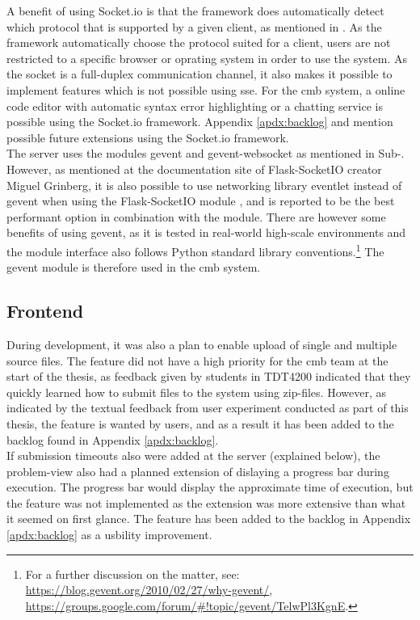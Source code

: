A benefit of using Socket.io is that the framework does automatically detect which protocol that is supported by a given client, as mentioned in . As the framework automatically choose the protocol suited for a client, users are not restricted to a specific browser or oprating system in order to use the system. As the socket is a full-duplex communication channel, it also makes it possible to implement features which is not possible using \gls{sse}. For the \gls{cmb} system, a online code editor with automatic syntax error highlighting or a chatting service is possible using the Socket.io framework. Appendix \ref{apdx:backlog} and  mention possible future extensions using the Socket.io framework. \\

The server uses the modules gevent \cite{GEVENT} and gevent-websocket \cite{GEVENTWEBSOCKET} as mentioned in Sub-. However, as mentioned at the documentation site of Flask-SocketIO creator Miguel Grinberg, it is also possible to use networking library eventlet \cite{EVENTLET} instead of gevent when using the Flask-SocketIO module \cite{FLASKSOCKETIO}, and is reported to be the best performant option in combination with the module. There are however some benefits of using gevent, as it is tested in real-world high-scale environments and the module interface also follows Python standard library conventions.\footnote{For a further discussion on the matter, see: \url{https://blog.gevent.org/2010/02/27/why-gevent/}, \url{https://groups.google.com/forum/\#!topic/gevent/TelwPl3KgnE}.} The gevent module is therefore used in the \gls{cmb} system.

\subsection{Frontend}
During development, it was also a plan to enable upload of single and multiple source files. The feature did not have a high priority for the \gls{cmb} team at the start of the thesis, as feedback given by students in TDT4200 indicated that they quickly learned how to submit files to the system using zip-files. However, as indicated by the textual feedback from user experiment conducted as part of this thesis, the feature is wanted by users, and as a result it has been added to the backlog found in Appendix \ref{apdx:backlog}. \\

If submission timeouts also were added at the server (explained below), the problem-view also had a planned extension of dislaying a progress bar during execution. The progress bar would display the approximate time of execution, but the feature was not implemented as the extension was more extensive than what it seemed on first glance. The feature has been added to the backlog in Appendix \ref{apdx:backlog} as a usbility improvement.

